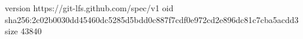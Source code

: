 version https://git-lfs.github.com/spec/v1
oid sha256:2c02b0030dd45460dc5285d5bdd0c887f7cdf0e972cd2e896dc81c7cba5acdd3
size 43840
